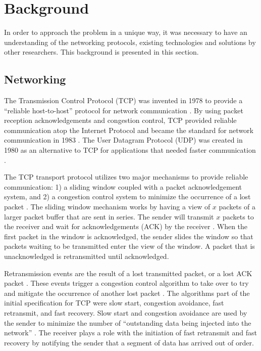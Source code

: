 \chapter{Background}

In order to approach the problem in a unique way, it was necessary to have an understanding of the networking protocols, existing technologies and solutions by other researchers. This background is presented in this section.

\section{Networking}

The Transmission Control Protocol (TCP) was invented in 1978 to provide a ``reliable host-to-host'' protocol for network communication \cite{cerf1978specification}. By using packet reception acknowledgements and congestion control, TCP provided reliable communication atop the Internet Protocol and became the standard for network communication in 1983 \cite{andrews2013who}. The User Datagram Protocol (UDP) was created in 1980 as an alternative to TCP for applications that needed faster communication \cite{postel1980user,kozierokr2005udp}.

The TCP transport protocol utilizes two major mechanisms to provide reliable communication: 1) a sliding window coupled with a packet acknowledgement system, and 2) a congestion control system to minimize the occurrence of a lost packet \cite{cerf1978specification}. The sliding window mechanism works by having a view of $x$ packets of a larger packet buffer that are sent in series. The sender will transmit $x$ packets to the receiver and wait for acknowledgements (ACK) by the receiver \cite{cerf1978specification}. When the first packet in the window is acknowledged, the sender slides the window so that packets waiting to be transmitted enter the view of the window. A packet that is unacknowledged is retransmitted until acknowledged.

Retransmission events are the result of a lost transmitted packet, or a lost ACK packet \cite{cerf1978specification}. These events trigger a congestion control algorithm to take over to try and mitigate the occurrence of another lost packet \cite{allman2009tcp}. The algorithms part of the initial specification for TCP were slow start, congestion avoidance, fast retransmit, and fast recovery. Slow start and congestion avoidance are used by the sender to minimize the number of ``outstanding data being injected into the network'' \cite{allman2009tcp}. The receiver plays a role with the initiation of fast retransmit and fast recovery by notifying the sender that a segment of data has arrived out of order.

